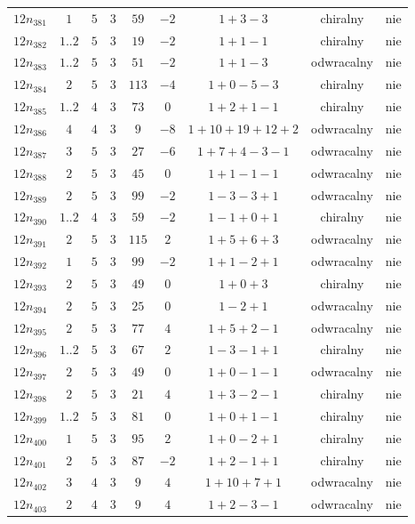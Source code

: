 \begin{longtable}{ccccccccc}
$12n_{381}$ & $1$ & $5$ & $3$ & $59$ & $-2$ & $1+3-3$ & chiralny & nie \\
$12n_{382}$ & $1..2$ & $5$ & $3$ & $19$ & $-2$ & $1+1-1$ & chiralny & nie \\
$12n_{383}$ & $1..2$ & $5$ & $3$ & $51$ & $-2$ & $1+1-3$ & odwracalny & nie \\
$12n_{384}$ & $2$ & $5$ & $3$ & $113$ & $-4$ & $1+0-5-3$ & chiralny & nie \\
$12n_{385}$ & $1..2$ & $4$ & $3$ & $73$ & $0$ & $1+2+1-1$ & chiralny & nie \\
$12n_{386}$ & $4$ & $4$ & $3$ & $9$ & $-8$ & $1+10+19+12+2$ & odwracalny & nie \\
$12n_{387}$ & $3$ & $5$ & $3$ & $27$ & $-6$ & $1+7+4-3-1$ & odwracalny & nie \\
$12n_{388}$ & $2$ & $5$ & $3$ & $45$ & $0$ & $1+1-1-1$ & odwracalny & nie \\
$12n_{389}$ & $2$ & $5$ & $3$ & $99$ & $-2$ & $1-3-3+1$ & odwracalny & nie \\
$12n_{390}$ & $1..2$ & $4$ & $3$ & $59$ & $-2$ & $1-1+0+1$ & chiralny & nie \\
$12n_{391}$ & $2$ & $5$ & $3$ & $115$ & $2$ & $1+5+6+3$ & odwracalny & nie \\
$12n_{392}$ & $1$ & $5$ & $3$ & $99$ & $-2$ & $1+1-2+1$ & odwracalny & nie \\
$12n_{393}$ & $2$ & $5$ & $3$ & $49$ & $0$ & $1+0+3$ & chiralny & nie \\
$12n_{394}$ & $2$ & $5$ & $3$ & $25$ & $0$ & $1-2+1$ & odwracalny & nie \\
$12n_{395}$ & $2$ & $5$ & $3$ & $77$ & $4$ & $1+5+2-1$ & odwracalny & nie \\
$12n_{396}$ & $1..2$ & $5$ & $3$ & $67$ & $2$ & $1-3-1+1$ & chiralny & nie \\
$12n_{397}$ & $2$ & $5$ & $3$ & $49$ & $0$ & $1+0-1-1$ & odwracalny & nie \\
$12n_{398}$ & $2$ & $5$ & $3$ & $21$ & $4$ & $1+3-2-1$ & chiralny & nie \\
$12n_{399}$ & $1..2$ & $5$ & $3$ & $81$ & $0$ & $1+0+1-1$ & chiralny & nie \\
$12n_{400}$ & $1$ & $5$ & $3$ & $95$ & $2$ & $1+0-2+1$ & chiralny & nie \\
$12n_{401}$ & $2$ & $5$ & $3$ & $87$ & $-2$ & $1+2-1+1$ & chiralny & nie \\
$12n_{402}$ & $3$ & $4$ & $3$ & $9$ & $4$ & $1+10+7+1$ & odwracalny & nie \\
$12n_{403}$ & $2$ & $4$ & $3$ & $9$ & $4$ & $1+2-3-1$ & odwracalny & nie \\

\end{longtable}
